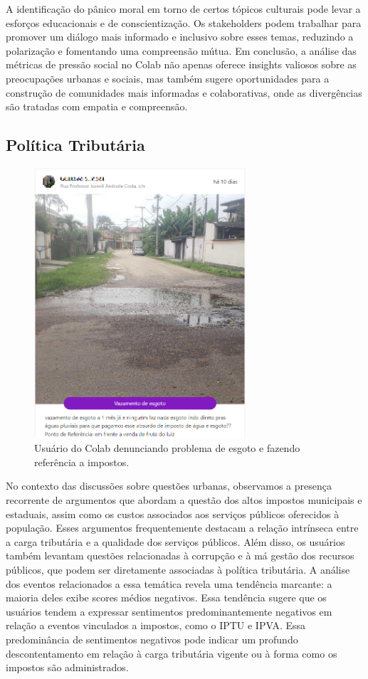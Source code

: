 A identificação do pânico moral em torno de certos tópicos culturais pode levar a esforços educacionais e de conscientização. Os stakeholders podem trabalhar para promover um diálogo mais informado e inclusivo sobre esses temas, reduzindo a polarização e fomentando uma compreensão mútua. Em conclusão, a análise das métricas de pressão social no Colab não apenas oferece insights valiosos sobre as preocupações urbanas e sociais, mas também sugere oportunidades para a construção de comunidades mais informadas e colaborativas, onde as divergências são tratadas com empatia e compreensão.

\subsection{Política Tributária}

\begin{figure}[htb]
	\centering
	\includegraphics[width=0.7\textwidth]{images/colab_posts_taxes.png}
	\caption{Usuário do Colab denunciando problema de esgoto e fazendo referência a impostos.}
	\label{fig:colab_posts_taxes}
\end{figure}

No contexto das discussões sobre questões urbanas, observamos a presença recorrente de argumentos que abordam a questão dos altos impostos municipais e estaduais, assim como os custos associados aos serviços públicos oferecidos à população. Esses argumentos frequentemente destacam a relação intrínseca entre a carga tributária e a qualidade dos serviços públicos. Além disso, os usuários também levantam questões relacionadas à corrupção e à má gestão dos recursos públicos, que podem ser diretamente associadas à política tributária. A análise dos eventos relacionados a essa temática revela uma tendência marcante: a maioria deles exibe scores médios negativos. Essa tendência sugere que os usuários tendem a expressar sentimentos predominantemente negativos em relação a eventos vinculados a impostos, como o IPTU e IPVA. Essa predominância de sentimentos negativos pode indicar um profundo descontentamento em relação à carga tributária vigente ou à forma como os impostos são administrados.

